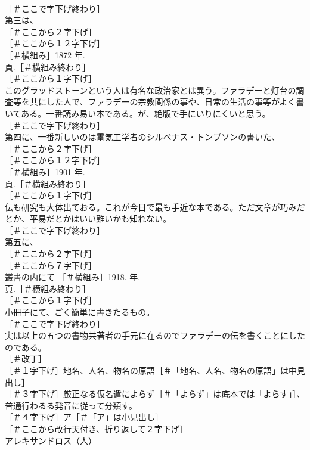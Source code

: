 \documentclass[8pt]{extreport}
\begin{document}
\begin{CJK}{UTF8}{min}
\\	［＃ここで字下げ終わり］
\\	第三は、
\\	［＃ここから２字下げ］
\\	［＃ここから１２字下げ］
\\	［＃横組み］1872 年. 
\\	頁.［＃横組み終わり］
\\	［＃ここから１字下げ］
\\	このグラッドストーンという人は有名な政治家とは異う。ファラデーと灯台の調査等を共にした人で、ファラデーの宗教関係の事や、日常の生活の事等がよく書いてある。一番読み易い本である。が、絶版で手にいりにくいと思う。
\\	［＃ここで字下げ終わり］
\\	第四に、一番新しいのは電気工学者のシルベナス・トンプソンの書いた、
\\	［＃ここから２字下げ］
\\	［＃ここから１２字下げ］
\\	［＃横組み］1901 年. 
\\	頁.［＃横組み終わり］
\\	［＃ここから１字下げ］
\\	伝も研究も大体出ておる。これが今日で最も手近な本である。ただ文章が巧みだとか、平易だとかはいい難いかも知れない。
\\	［＃ここで字下げ終わり］
\\	第五に、
\\	［＃ここから２字下げ］
\\	［＃ここから７字下げ］
\\	叢書の内にて ［＃横組み］1918. 年. 
\\	頁.［＃横組み終わり］
\\	［＃ここから１字下げ］
\\	小冊子にて、ごく簡単に書きたるもの。
\\	［＃ここで字下げ終わり］
\\	実は以上の五つの書物共著者の手元に在るのでファラデーの伝を書くことにしたのである。
\\	［＃改丁］
\\	［＃１字下げ］地名、人名、物名の原語［＃「地名、人名、物名の原語」は中見出し］
\\	［＃３字下げ］厳正なる仮名遣によらず［＃「よらず」は底本では「よらす」］、普通行わるる発音に従って分類す。
\\	［＃４字下げ］ア［＃「ア」は小見出し］
\\	［＃ここから改行天付き、折り返して２字下げ］
\\	アレキサンドロス（人）

\end{CJK}
\end{document}

